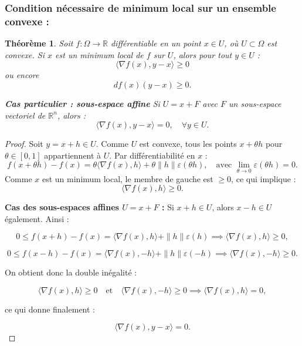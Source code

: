 \documentclass[a4paper,12pt,openany]{book}
\theoremstyle{plain}
\newtheorem{theorem}{Théorème}[section]
\theoremstyle{definition}
\theoremstyle{remark}
\theoremstyle{nbstyle}
\begin{document}
	\subsubsection{Condition nécessaire de minimum local sur un ensemble convexe :}
	\begin{theorem}
		Soit $f : \Omega \to \mathbb{R}$ différentiable en un point $x \in U$, où $U \subset \Omega$ est convexe.  
		Si $x$ est un minimum local de $f$ sur $U$, alors pour tout $y \in U$ :
		\[
		\langle \nabla f(x), y - x \rangle \ge 0
		\]
		ou encore
		\[
		df(x)(y-x) \ge 0.
		\]
		
		\textbf{Cas particulier : sous-espace affine}  
		Si $U = x + F$ avec $F$ un sous-espace vectoriel de $\mathbb{R}^n$, alors :
		\[
		\langle \nabla f(x), y - x \rangle = 0, \quad \forall y \in U.
		\]
	\end{theorem}
	\begin{proof} 
		Soit $y = x + h \in U$. Comme $U$ est convexe, tous les points $x + \theta h$ pour $\theta \in [0,1]$ appartiennent à $U$.  
		Par différentiabilité en $x$ :
		\[
		f(x + \theta h) - f(x) = \theta \langle \nabla f(x), h \rangle + \theta \|h\| \varepsilon(\theta h), 
		\quad \text{avec } \lim_{\theta \to 0} \varepsilon(\theta h) = 0.
		\]
		Comme $x$ est un minimum local, le membre de gauche est $\ge 0$, ce qui implique :
		\[
		\langle \nabla f(x), h \rangle \ge 0.
		\]
		
		
		\textbf{Cas des sous-espaces affines $U = x + F$ :}  
		Si $x+h \in U$, alors $x-h \in U$ également. Ainsi :
		
		\[
		0 \le f(x + h) - f(x) = \langle \nabla f(x), h \rangle + \|h\| \varepsilon(h) \implies \langle \nabla f(x), h \rangle \ge 0,
		\]
		
		\[
		0 \le f(x - h) - f(x) = \langle \nabla f(x), -h \rangle + \|h\| \varepsilon(-h) \implies \langle \nabla f(x), -h \rangle \ge 0.
		\]
		
		On obtient donc la double inégalité :
		
		\[
		\langle \nabla f(x), h \rangle \ge 0 \quad \text{et} \quad \langle \nabla f(x), -h \rangle \ge 0 \implies \langle \nabla f(x), h \rangle = 0,
		\]
		
		ce qui donne finalement :
		
		\[
		\langle \nabla f(x), y - x \rangle = 0.
		\]
	\end{proof}
	
\end{document}
